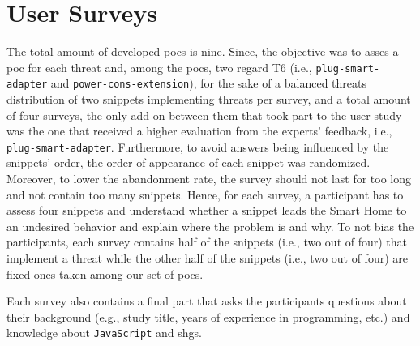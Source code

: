 \section{User Surveys}
\label{sec:usersurv}
The total amount of developed \glspl{poc} is nine. Since, the objective was to asses a \gls{poc} for each threat and, among the \glspl{poc}, two regard T6 (i.e., \texttt{plug-smart-adapter} and \texttt{power-cons-extension}), for the sake of a balanced threats distribution of two snippets implementing threats per survey, and a total amount of four surveys, the only add-on between them that took part to the user study was the one that received a higher evaluation from the experts' feedback, i.e., \texttt{plug-smart-adapter}. Furthermore, to avoid answers being influenced by the snippets' order, the order of appearance of each snippet was randomized.
Moreover, to lower the abandonment rate, the survey should not last for too long and not contain too many snippets. Hence, for each survey, a participant has to assess four snippets and understand whether a snippet leads the Smart Home to an undesired behavior and explain where the problem is and why. To not bias the participants, each survey contains half of the snippets (i.e., two out of four) that implement a threat while the other half of the snippets (i.e., two out of four) are fixed ones taken among our set of \glspl{poc}. 

Each survey also contains a final part that asks the participants questions about their background (e.g., study title, years of experience in programming, etc.) and knowledge about \texttt{JavaScript} and \glspl{shg}.

